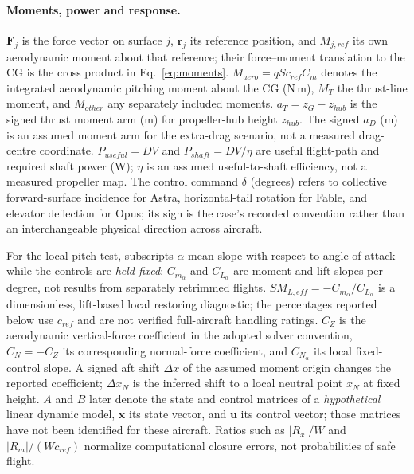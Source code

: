 \documentclass[10pt,letterpaper]{article}
\begin{document}
\paragraph{Moments, power and response.} $\boldsymbol F_j$ is the force vector on surface $j$, $\boldsymbol r_j$ its reference position, and $M_{j,ref}$ its own aerodynamic moment about that reference; their force--moment translation to the CG is the cross product in Eq.~\ref{eq:moments}. $M_{aero}=qSc_{ref}C_m$ denotes the integrated aerodynamic pitching moment about the CG (N\,m), $M_T$ the thrust-line moment, and $M_{other}$ any separately included moments. $a_T=z_G-z_{hub}$ is the signed thrust moment arm (m) for propeller-hub height $z_{hub}$. The signed $a_D$ (m) is an assumed moment arm for the extra-drag scenario, not a measured drag-centre coordinate. $P_{useful}=DV$ and $P_{shaft}=DV/\eta$ are useful flight-path and required shaft power (W); $\eta$ is an assumed useful-to-shaft efficiency, not a measured propeller map. The control command $\delta$ (degrees) refers to collective forward-surface incidence for Astra, horizontal-tail rotation for Fable, and elevator deflection for Opus; its sign is the case's recorded convention rather than an interchangeable physical direction across aircraft.

For the local pitch test, subscripts $\alpha$ mean slope with respect to angle of attack while the controls are \emph{held fixed}: $C_{m_\alpha}$ and $C_{L_\alpha}$ are moment and lift slopes per degree, not results from separately retrimmed flights. $SM_{L,eff}=-C_{m_\alpha}/C_{L_\alpha}$ is a dimensionless, lift-based local restoring diagnostic; the percentages reported below use $c_{ref}$ and are not verified full-aircraft handling ratings. $C_Z$ is the aerodynamic vertical-force coefficient in the adopted solver convention, $C_N=-C_Z$ its corresponding normal-force coefficient, and $C_{N_\alpha}$ its local fixed-control slope. A signed aft shift $\Delta x$ of the assumed moment origin changes the reported coefficient; $\Delta x_N$ is the inferred shift to a local neutral point $x_N$ at fixed height. $A$ and $B$ later denote the state and control matrices of a \emph{hypothetical} linear dynamic model, $\boldsymbol x$ its state vector, and $\boldsymbol u$ its control vector; those matrices have not been identified for these aircraft. Ratios such as $|R_x|/W$ and $|R_m|/(Wc_{ref})$ normalize computational closure errors, not probabilities of safe flight.
\end{document}
